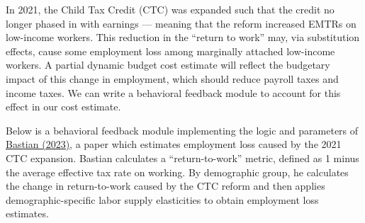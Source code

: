\documentclass[
]{article}
\begin{document}
In 2021, the Child Tax Credit (CTC) was expanded such that the credit no
longer phased in with earnings --- meaning that the reform increased
EMTRs on low-income workers. This reduction in the ``return to work''
may, via substitution effects, cause some employment loss among
marginally attached low-income workers. A partial dynamic budget cost
estimate will reflect the budgetary impact of this change in employment,
which should reduce payroll taxes and income taxes. We can write a
behavioral feedback module to account for this effect in our cost
estimate.

Below is a behavioral feedback module implementing the logic and
parameters of
\href{file:///C:/Users/jar335/Downloads/Bastian_CTCexpansion_2023.pdf}{Bastian
(2023)}, a paper which estimates employment loss caused by the 2021 CTC
expansion. Bastian calculates a ``return-to-work'' metric, defined as 1
minus the average effective tax rate on working. By demographic group,
he calculates the change in return-to-work caused by the CTC reform and
then applies demographic-specific labor supply elasticities to obtain
employment loss estimates.
\end{document}
